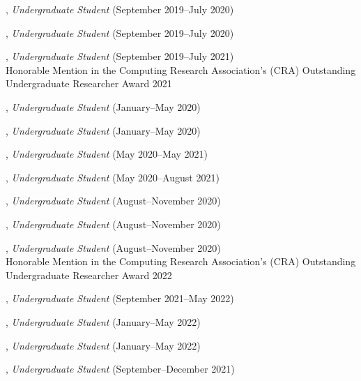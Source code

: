 \documentclass[10pt]{article}
\newenvironment{myindentpar}[1]%
{\begin{list}{}%
         {\setlength{\leftmargin}{#1}}%
         \item[]%
}
{\end{list}}
\newcounter{list}
\begin{document}
\begin{myindentpar}{0.75cm}
\hspace{-0.75cm}{\bf Xiangyu Dong}, \textit{Undergraduate Student} (September 2019--July 2020)

\hspace{-0.75cm}{\bf Tianze Zheng}, \textit{Undergraduate Student} (September 2019--July 2020)

\hspace{-0.75cm}{\bf Bo Ni}, \textit{Undergraduate Student} (September 2019--July 2021) \\
	Honorable Mention in the Computing Research Association's (CRA) Outstanding Undergraduate Researcher Award 2021

\hspace{-0.75cm}{\bf Alvin Alaphat}, \textit{Undergraduate Student} (January--May 2020)

\hspace{-0.75cm}{\bf Luke Marushack}, \textit{Undergraduate Student} (January--May 2020)

\hspace{-0.75cm}{\bf Michael Lee}, \textit{Undergraduate Student} (May 2020--May 2021)

\hspace{-0.75cm}{\bf Ann Hermann}, \textit{Undergraduate Student} (May 2020--August 2021)

\hspace{-0.75cm}{\bf Joseph Kuebler}, \textit{Undergraduate Student} (August--November 2020)

\hspace{-0.75cm}{\bf Facundo Munoz}, \textit{Undergraduate Student} (August--November 2020)

\hspace{-0.75cm}{\bf Fangcong Yin}, \textit{Undergraduate Student} (August--November 2020) \\
	Honorable Mention in the Computing Research Association's (CRA) Outstanding Undergraduate Researcher Award 2022

\hspace{-0.75cm}{\bf Jackson Ballow}, \textit{Undergraduate Student} (September 2021--May 2022)

\hspace{-0.75cm}{\bf Ryan Pairitz}, \textit{Undergraduate Student} (January--May 2022)

\hspace{-0.75cm}{\bf Kekoa Wang}, \textit{Undergraduate Student} (January--May 2022)

\hspace{-0.75cm}{\bf Longqing Chen}, \textit{Undergraduate Student} (September--December 2021)


\end{myindentpar}
\end{document}
